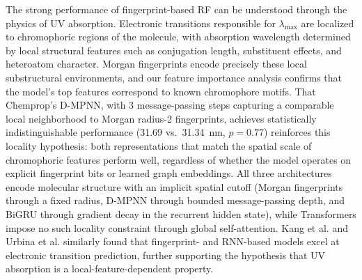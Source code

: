 The strong performance of fingerprint-based RF can be understood through the physics of UV absorption.
Electronic transitions responsible for $\lambda_{\max}$ are localized to chromophoric regions of the molecule, with absorption wavelength determined by local structural features such as conjugation length, substituent effects, and heteroatom character\cite{flemingMolecular2010, reichardt2011solvents}.
Morgan fingerprints encode precisely these local substructural environments\cite{rogers2010extended}, and our feature importance analysis confirms that the model's top features correspond to known chromophore motifs.
That Chemprop's D-MPNN, with 3 message-passing steps capturing a comparable local neighborhood to Morgan radius-2 fingerprints, achieves statistically indistinguishable performance (31.69 vs.\ 31.34~nm, $p = 0.77$) reinforces this locality hypothesis: both representations that match the spatial scale of chromophoric features perform well, regardless of whether the model operates on explicit fingerprint bits or learned graph embeddings.
All three architectures encode molecular structure with an implicit spatial cutoff (Morgan fingerprints through a fixed radius, D-MPNN through bounded message-passing depth, and BiGRU through gradient decay in the recurrent hidden state), while Transformers impose no such locality constraint through global self-attention.
Kang et al.\cite{kang2020prediction} and Urbina et al.\cite{beard2022uvadvisor} similarly found that fingerprint- and RNN-based models excel at electronic transition prediction, further supporting the hypothesis that UV absorption is a local-feature-dependent property.

